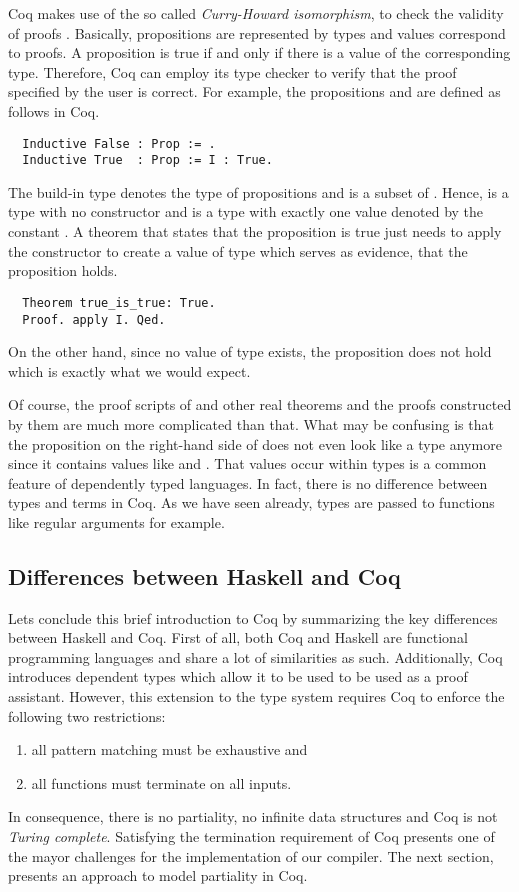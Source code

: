 Coq makes use of the so called \textit{Curry-Howard isomorphism}, to check the validity of proofs \cite[p.~1]{CoqDevTeam:2018}.
Basically, propositions are represented by types and values correspond to proofs.
A proposition is true if and only if there is a value of the corresponding type.
Therefore, Coq can employ its type checker to verify that the proof specified by the user is correct.
For example, the propositions  and  are defined as follows in Coq.
\begin{verbatim}
  Inductive False : Prop := .
  Inductive True  : Prop := I : True.
\end{verbatim}
The build-in type  denotes the type of propositions and is a subset of .
Hence,  is a type with no constructor and  is a type with exactly one value denoted by the constant .
A theorem that states that the proposition  is true just needs to apply the constructor  to create a value of type  which serves as evidence, that the proposition holds.
\begin{verbatim}
  Theorem true_is_true: True.
  Proof. apply I. Qed.
\end{verbatim}
On the other hand, since no value of type  exists, the proposition  does not hold which is exactly what we would expect.

Of course, the proof scripts of  and other real theorems and the proofs constructed by them are much more complicated than that.
What may be confusing is that the proposition on the right-hand side of  does not even look like a type anymore since it contains values like  and .
That values occur within types is a common feature of dependently typed languages.
In fact, there is no difference between types and terms in Coq.
As we have seen already, types are passed to functions like regular arguments for example.

\subsection{Differences between Haskell and Coq} \label{sec:preliminaries:coq:summary}
Lets conclude this brief introduction to Coq by summarizing the key differences between Haskell and Coq.
First of all, both Coq and Haskell are functional programming languages and share a lot of similarities as such.
Additionally, Coq introduces dependent types which allow it to be used to be used as a proof assistant.
However, this extension to the type system requires Coq to enforce the following two restrictions:
\begin{enumerate}
  \item all pattern matching must be exhaustive and
  \item all functions must terminate on all inputs.
\end{enumerate}
In consequence, there is no partiality, no infinite data structures and Coq is not \textit{Turing complete}.
Satisfying the termination requirement of Coq presents one of the mayor challenges for the implementation of our compiler.
The next section, presents an approach to model partiality in Coq.
